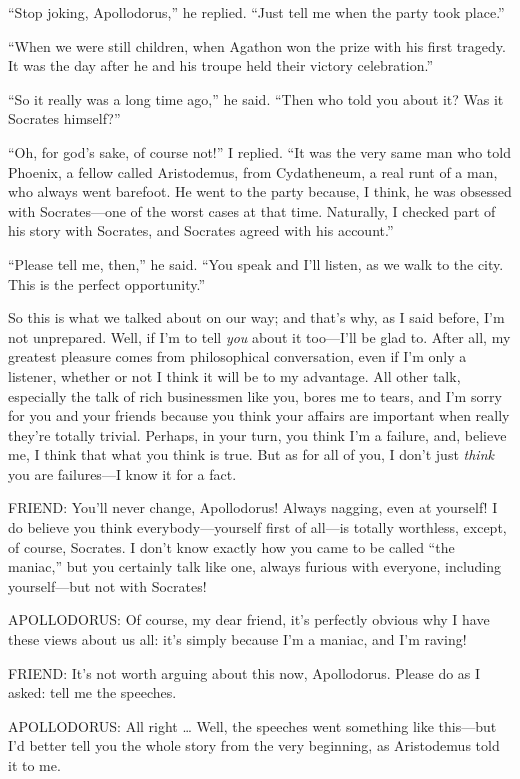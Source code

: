 “Stop joking, Apollodorus,” he replied. “Just tell me when the party
took place.”

“When we were still children, when Agathon won the prize with his first
tragedy. It was the day after he and his troupe held their victory
celebration.”

“So it really was a long time ago,” he said. “Then who told you about
it? Was it Socrates himself?”

“Oh, for god's sake, of course not!” I replied. “It was the very same
man who told Phoenix, a fellow called Aristodemus, from
Cydatheneum, a real runt of a man, who always went barefoot. He went to
the party because, I think, he was obsessed with Socrates---one of the
worst cases at that time. Naturally, I checked part of his story with
Socrates, and Socrates agreed with his account.”

“Please tell me, then,” he said. “You speak and I'll listen, as we walk
to the city. This is the perfect opportunity.”

So this is what we talked about on our way; and that's why, as I said
before, I'm not unprepared. Well, if I'm to tell {\em you} about
it too---I'll be glad to. After all, my greatest pleasure comes from
philosophical conversation, even if I'm only a listener, whether or not
I think it will be to my advantage. All other talk, especially the talk
of rich businessmen like you, bores me to tears, and I'm sorry for you
and your friends because you think your affairs are important when
really they're totally trivial. Perhaps, in your turn, you think
I'm a failure, and, believe me, I think that what you think is true. But
as for all of you, I don't just {\em think} you are failures---I know it
for a fact.

FRIEND: You'll never change, Apollodorus! Always nagging, even at
yourself! I do believe you think everybody---yourself first of all---is
totally worthless, except, of course, Socrates. I don't know exactly how
you came to be called “the maniac,” but you certainly talk like one,
always furious with everyone, including yourself---but not with
Socrates!

APOLLODORUS: Of course, my dear friend, it's perfectly obvious why I 
have these views about us all: it's simply because I'm a maniac,
and I'm raving!

FRIEND: It's not worth arguing about this now, Apollodorus. Please do as
I asked: tell me the speeches.

APOLLODORUS: All right \ldots{} Well, the speeches went something like
this---but I'd better tell you the whole story from the very beginning,
as Aristodemus told it to me.


